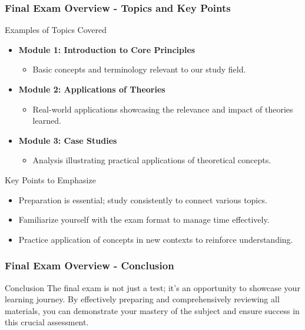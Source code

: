 \documentclass[aspectratio=169]{beamer}
\begin{document}
\begin{frame}[fragile]
    \frametitle{Final Exam Overview - Topics and Key Points}
    \begin{block}{Examples of Topics Covered}
        \begin{itemize}
            \item \textbf{Module 1: Introduction to Core Principles}
            \begin{itemize}
                \item Basic concepts and terminology relevant to our study field.
            \end{itemize}
            \item \textbf{Module 2: Applications of Theories}
            \begin{itemize}
                \item Real-world applications showcasing the relevance and impact of theories learned.
            \end{itemize}
            \item \textbf{Module 3: Case Studies}
            \begin{itemize}
                \item Analysis illustrating practical applications of theoretical concepts.
            \end{itemize}
        \end{itemize}
    \end{block}

    \begin{block}{Key Points to Emphasize}
        \begin{itemize}
            \item Preparation is essential; study consistently to connect various topics.
            \item Familiarize yourself with the exam format to manage time effectively.
            \item Practice application of concepts in new contexts to reinforce understanding.
        \end{itemize}
    \end{block}

\end{frame}

\begin{frame}[fragile]
    \frametitle{Final Exam Overview - Conclusion}
    \begin{block}{Conclusion}
        The final exam is not just a test; it’s an opportunity to showcase your learning journey. 
        By effectively preparing and comprehensively reviewing all materials, you can demonstrate your mastery of the subject and ensure success in this crucial assessment.
    \end{block}
\end{frame}
\end{document}
